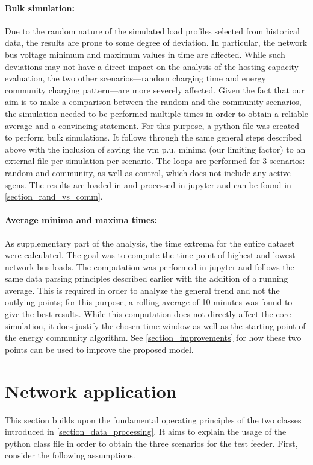 \documentclass[a4paper,10pt]{report}
\begin{document}
\paragraph{Bulk simulation:} Due to the random nature of the simulated load profiles selected from historical data, the results are prone to some degree of deviation. In particular, the network bus voltage minimum and maximum values in time are affected. While such deviations may not have a direct impact on the analysis of the hosting capacity evaluation, the two other scenarios---random charging time and energy community charging pattern---are more severely affected. Given the fact that our aim is to make a comparison between the random and the community scenarios, the simulation needed to be performed multiple times in order to obtain a reliable average and a convincing statement. For this purpose, a python file was created to perform bulk simulations. It follows through the same general steps described above with the inclusion of saving the vm p.u. minima (our limiting factor) to an external file per simulation per scenario. The loops are performed for 3 scenarios: random and community, as well as control, which does not include any active sgens. The results are loaded in and processed in jupyter and can be found in \cref{section_rand_vs_comm}.

\paragraph{Average minima and maxima times:} As supplementary part of the analysis, the time extrema for the entire dataset were calculated. The goal was to compute the time point of highest and lowest network bus loads. The computation was performed in jupyter and follows the same data parsing principles described earlier with the addition of a running average. This is required in order to analyze the general trend and not the outlying points; for this purpose, a rolling average of 10 minutes was found to give the best results. While this computation does not directly affect the core simulation, it does justify the chosen time window as well as the starting point of the energy community algorithm. See \cref{section_improvements} for how these two points can be used to improve the proposed model.

\newpage
\section{Network application}\label{section_network_application}
This section builds upon the fundamental operating principles of the two classes introduced in \cref{section_data_processing}. It aims to explain the usage of the python class file in order to obtain the three scenarios for the test feeder. First, consider the following assumptions.
\end{document}
